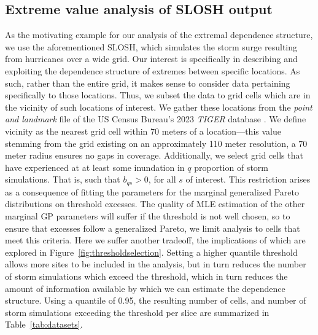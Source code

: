 \subsection{Extreme value analysis of SLOSH output\label{sec:slosh}}
As the motivating example for our analysis of the extremal dependence structure, we 
    use the aforementioned SLOSH, which simulates the storm surge resulting 
    from hurricanes over a wide grid.  Our interest is specifically in describing 
    and exploiting the dependence structure of extremes between specific locations.  
    As such, rather than the entire grid, it makes sense to consider data pertaining
    specifically to those locations. 
    Thus, we subset the data to grid cells which are in the vicinity of such locations 
    of interest.  We gather these locations from the \emph{point and landmark} file 
    of the US Census Bureau's 2023 \emph{TIGER} database \citep{tiger}.
    We define vicinity as the nearest grid cell within 70 meters of a location---this 
    value stemming from the grid existing on an approximately 110 meter resolution, a 
    70 meter radius ensures no gaps in coverage.
    Additionally, we select grid cells that have experienced at at least some inundation 
    in $q$ proportion of storm simulations.  That is, such that $b_{qs} > 0$, for all 
    $s$ of interest.  This restriction arises as a consequence of fitting the parameters 
    for the marginal generalized Pareto distributions on threshold excesses.
    The quality of MLE estimation of the other marginal GP parameters will suffer if the
    threshold is not well chosen, so to ensure that excesses follow a generalized Pareto,
    we limit analysis to cells that meet this criteria.
    Here we suffer another tradeoff, the implications of which are explored in 
    Figure~\ref{fig:thresholdselection}.  Setting a higher quantile threshold allows more 
    sites to be included in the analysis, but in turn reduces the number of storm 
    simulations which exceed the threshold, which in turn reduces the amount of 
    information available by which we can estimate the dependence structure. Using a 
    quantile of \num{0.95}, the resulting number of cells, and number of storm simulations
    exceeding the threshold per slice are summarized in Table~\ref{tab:datasets}.

